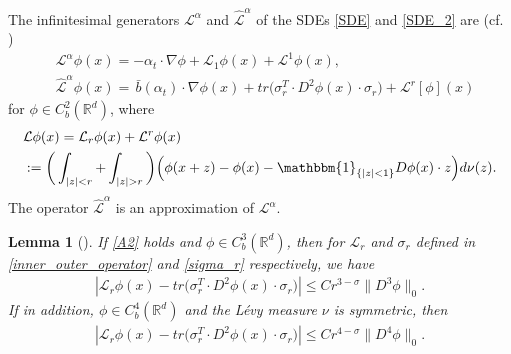 \documentclass[a4paper,  twoside, 10pt, leqno]{amsart}
\newcommand{\rd}{\mathbb{R}^d}
\newtheorem{lemma}[thm]{Lemma}
\theoremstyle{remark}
\theoremstyle{definition}
\begin{document}
The infinitesimal generators
$\mathcal{L}^{\alpha}$ and $\hat{\mathcal{L}}^{\alpha}$ of the SDEs
\eqref{SDE} and \eqref{SDE_2} are
(cf. \cite{applebaum2009levy})
\begin{align*}
    &\mathcal{L}^{\alpha} \phi (x)= -\alpha_{t} \cdot \nabla \phi + \mathcal{L}_1 \phi ( x ) + \mathcal{L}^1 \phi ( x ),
    \\
&\hat{\mathcal{L}}^{\alpha} \phi (x)=  \, \bar{b}(\alpha_{t}) \cdot \nabla \phi(x) + tr \big(  \sigma_{r}^T \cdot D^{2} \phi ( x )\cdot \sigma_{r}  \big) + \mathcal{L}^{r}[\phi](x)
\end{align*}
for $\phi\in C^2_b(\rd)$, where
    \begin{align} \label{inner_outer_operator}
    \begin{split}
       &\mathcal{L} \phi ( x ) = \mathcal{L}_r \phi ( x ) +
      \mathcal{L}^r \phi ( x )\\
      &:= \bigg(\int_{|z| < r}+   \int_{|z| > r}\bigg) \Big(\phi ( x+z
      ) - \phi ( x ) - \mathbbm{1}_{\{|z|<1\}} D \phi ( x )\cdot z
      \Big) d \nu ( z ).
\end{split}    
    \end{align}
The operator  $\hat{\mathcal{L}}^{\alpha}$ is an approximation of $\mathcal{L}^{\alpha}$.
       
\begin{lemma}[\cite{espen_chioma_keneth}]\label{lem:small_jump}
    If \ref{A2} holds and $\phi \in C_{b}^{3}(\rd)$, then for $\mathcal{L}_r$ and $\sigma_r$ defined in \eqref{inner_outer_operator} and \eqref{sigma_r} respectively, we have 
    \begin{align*}
        | \mathcal{L}_r \phi ( x ) - tr \big(  \sigma_{r}^T \cdot D^{2} \phi ( x )\cdot \sigma_{r}  \big) | \leq C r^{3-\sigma} \| D^{3} \phi \|_{0}.
    \end{align*}
 If in addition, $\phi \in C_{b}^{4}(\rd)$ and the L\'evy measure $\nu$ is symmetric, then 
 \begin{align*}
        | \mathcal{L}_r \phi ( x ) - tr \big(  \sigma_{r}^T \cdot D^{2} \phi ( x )\cdot \sigma_{r}  \big) | \leq C r^{4-\sigma} \| D^{4} \phi \|_{0}.
    \end{align*}   
\end{lemma}
\end{document}
